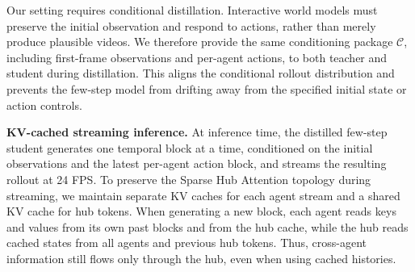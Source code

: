 Our setting requires conditional distillation.
Interactive world models must preserve the initial observation and respond to actions, rather than merely produce plausible videos.
We therefore provide the same conditioning package $\mathcal{C}$, including first-frame observations and per-agent actions, to both teacher and student during distillation.
This aligns the conditional rollout distribution and prevents the few-step model from drifting away from the specified initial state or action controls.

\noindent\textbf{KV-cached streaming inference.}
At inference time, the distilled few-step student generates one temporal block at a time, conditioned on the initial observations and the latest per-agent action block, and streams the resulting rollout at 24 FPS.
To preserve the Sparse Hub Attention topology during streaming, we maintain separate KV caches for each agent stream and a shared KV cache for hub tokens.
When generating a new block, each agent reads keys and values from its own past blocks and from the hub cache, while the hub reads cached states from all agents and previous hub tokens.
Thus, cross-agent information still flows only through the hub, even when using cached histories.
